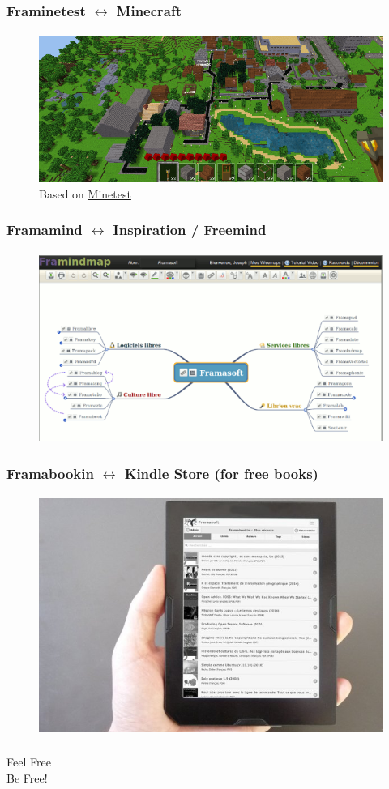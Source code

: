 \documentclass{beamer}
\begin{document}
	\begin{frame}
	\frametitle{Framinetest $\leftrightarrow$ Minecraft}
	\framesubtitle{}
	        \begin{figure}[h]
                \centering
                \includegraphics[width=.8\textwidth]{./images/framinetest}
		\caption{Based on \href{http://www.minetest.net}{Minetest}}
        	\end{figure}
	\end{frame}

	\begin{frame}
	\frametitle{Framamind $\leftrightarrow$ Inspiration / Freemind}
	\framesubtitle{}
	        \begin{figure}[h]
                \centering
                \includegraphics[width=.8\textwidth]{./images/framamind}
        	\end{figure}
	\end{frame}

	\begin{frame}
	\frametitle{Framabookin $\leftrightarrow$ Kindle Store (for free books)}
	\framesubtitle{}
	        \begin{figure}[h]
                \centering
                \includegraphics[width=.8\textwidth]{./images/framabookin}
        	\end{figure}
	\end{frame}








	\begin{frame}
	\frametitle{}
	\framesubtitle{}
	\centering\huge
	Feel Free\\
	Be Free!
	\end{frame}
\end{document}
